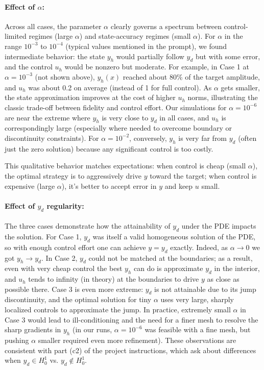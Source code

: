 \paragraph{Effect of $\alpha$:} Across all cases, the parameter $\alpha$ clearly governs a spectrum between control-limited regimes (large $\alpha$) and state-accuracy regimes (small $\alpha$). For $\alpha$ in the range $10^{-3}$ to $10^{-4}$ (typical values mentioned in the prompt), we found intermediate behavior: the state $y_h$ would partially follow $y_d$ but with some error, and the control $u_h$ would be nonzero but moderate. For example, in Case 1 at $\alpha=10^{-3}$ (not shown above), $y_h(x)$ reached about 80\% of the target amplitude, and $u_h$ was about 0.2 on average (instead of 1 for full control). As $\alpha$ gets smaller, the state approximation improves at the cost of higher $u_h$ norms, illustrating the classic trade-off between fidelity and control effort. Our simulations for $\alpha=10^{-6}$ are near the extreme where $y_h$ is very close to $y_d$ in all cases, and $u_h$ is correspondingly large (especially where needed to overcome boundary or discontinuity constraints). For $\alpha=10^{-2}$, conversely, $y_h$ is very far from $y_d$ (often just the zero solution) because any significant control is too costly.

This qualitative behavior matches expectations: when control is cheap (small $\alpha$), the optimal strategy is to aggressively drive $y$ toward the target; when control is expensive (large $\alpha$), it's better to accept error in $y$ and keep $u$ small.

\paragraph{Effect of $y_d$ regularity:} The three cases demonstrate how the attainability of $y_d$ under the PDE impacts the solution. For Case 1, $y_d$ was itself a valid homogeneous solution of the PDE, so with enough control effort one can achieve $y=y_d$ exactly. Indeed, as $\alpha\to 0$ we got $y_h\to y_d$. In Case 2, $y_d$ could not be matched at the boundaries; as a result, even with very cheap control the best $y_h$ can do is approximate $y_d$ in the interior, and $u_h$ tends to infinity (in theory) at the boundaries to drive $y$ as close as possible there. Case 3 is even more extreme: $y_d$ is not attainable due to its jump discontinuity, and the optimal solution for tiny $\alpha$ uses very large, sharply localized controls to approximate the jump. In practice, extremely small $\alpha$ in Case 3 would lead to ill-conditioning and the need for a finer mesh to resolve the sharp gradients in $y_h$ (in our runs, $\alpha=10^{-6}$ was feasible with a fine mesh, but pushing $\alpha$ smaller required even more refinement). These observations are consistent with part (c2) of the project instructions, which ask about differences when $y_d \in H^1_0$ vs. $y_d\notin H^1_0$.

